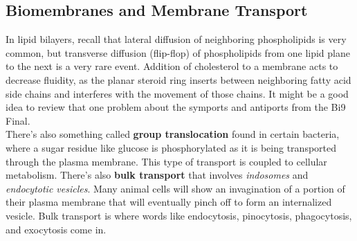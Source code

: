 \documentclass{article}
\theoremstyle{plain}%
\theoremstyle{definition}
\theoremstyle{remark}
\begin{document}
\subsection{Biomembranes and Membrane Transport}
In lipid bilayers, recall that lateral diffusion of neighboring phospholipids is very common, but transverse diffusion (flip-flop) of phospholipids from one lipid plane to the next is a very rare event. Addition of cholesterol to a membrane acts to decrease fluidity, as the planar steroid ring inserts between neighboring fatty acid side chains and interferes with the movement of those chains. It might be a good idea to review that one problem about the symports and antiports from the Bi9 Final. \\
\indent There's also something called \textbf{group translocation} found in certain bacteria, where a sugar residue like glucose is phosphorylated as it is being transported through the plasma membrane. This type of transport is coupled to cellular metabolism. There's also \textbf{bulk transport} that involves \textit{indosomes} and \textit{endocytotic vesicles}. Many animal cells will show an invagination of a portion of their plasma membrane that will eventually pinch off to form an internalized vesicle. Bulk transport is where words like endocytosis, pinocytosis, phagocytosis, and exocytosis come in.
\end{document}
